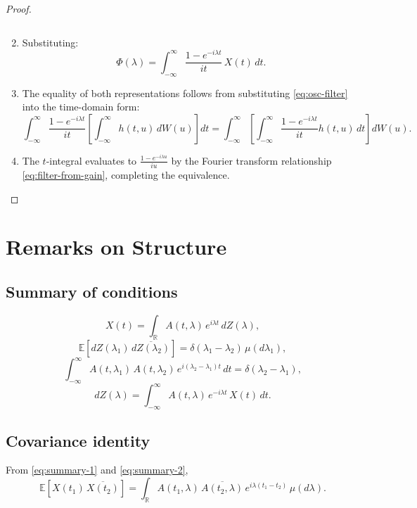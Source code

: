\documentclass[12pt]{article}
\theoremstyle{plain}
\begin{document}
\begin{proof}
\begin{enumerate}
\[\]
\item Substituting:
\[
\Phi(\lambda) = \int_{-\infty}^\infty \frac{1 - e^{-i\lambda t}}{it} \, X(t) \, dt.
\]
\item The equality of both representations follows from substituting \eqref{eq:osc-filter} into the time-domain form:
\[
\int_{-\infty}^\infty \frac{1 - e^{-i\lambda t}}{it} \left[\int_{-\infty}^\infty h(t,u) \, dW(u)\right] dt = \int_{-\infty}^\infty \left[\int_{-\infty}^\infty \frac{1 - e^{-i\lambda t}}{it} h(t,u) \, dt\right] dW(u).
\]
\item The $t$-integral evaluates to $\frac{1 - e^{-i\lambda u}}{iu}$ by the Fourier transform relationship \eqref{eq:filter-from-gain}, completing the equivalence.
\end{enumerate}
\end{proof}

\section{Remarks on Structure}

\subsection*{Summary of conditions}
\begin{equation}\label{eq:summary-1}
X(t) = \int_{\mathbb{R}} A(t,\lambda)\,e^{i\lambda t}\,dZ(\lambda),
\end{equation}
\begin{equation}\label{eq:summary-2}
\mathbb{E}[dZ(\lambda_1)\,\overline{dZ(\lambda_2)}] = \delta(\lambda_1-\lambda_2)\,\mu(d\lambda_1),
\end{equation}
\begin{equation}\label{eq:summary-3}
\int_{-\infty}^{\infty} A(t,\lambda_1)\,A(t,\lambda_2)\,e^{i(\lambda_2-\lambda_1)t}\,dt = \delta(\lambda_2-\lambda_1),
\end{equation}
\begin{equation}\label{eq:summary-4}
dZ(\lambda) = \int_{-\infty}^{\infty} A(t,\lambda)\,e^{-i\lambda t}\,X(t)\,dt.
\end{equation}

\subsection*{Covariance identity}
From \eqref{eq:summary-1} and \eqref{eq:summary-2},
\begin{equation}\label{eq:cov-id}
\mathbb{E}[X(t_1)\,\overline{X(t_2)}] = \int_{\mathbb{R}} A(t_1,\lambda)\,\overline{A(t_2,\lambda)}\,e^{i\lambda(t_1-t_2)}\,\mu(d\lambda).
\end{equation}
\end{document}

